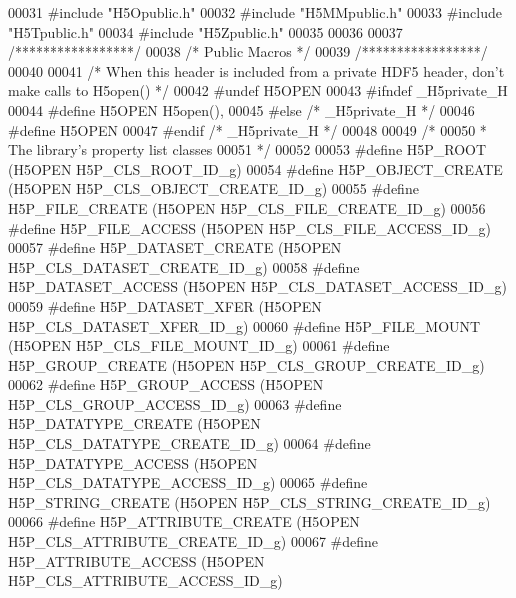 \begin{DoxyCode}
00031 \textcolor{preprocessor}{#include "H5Opublic.h"}
00032 \textcolor{preprocessor}{#include "H5MMpublic.h"}
00033 \textcolor{preprocessor}{#include "H5Tpublic.h"}
00034 \textcolor{preprocessor}{#include "H5Zpublic.h"}
00035 
00036 
00037 \textcolor{comment}{/*****************/}
00038 \textcolor{comment}{/* Public Macros */}
00039 \textcolor{comment}{/*****************/}
00040 
00041 \textcolor{comment}{/* When this header is included from a private HDF5 header, don't make calls to H5open() */}
00042 \textcolor{preprocessor}{#undef H5OPEN}
00043 \textcolor{preprocessor}{#ifndef \_H5private\_H}
00044 \textcolor{preprocessor}{#define H5OPEN        H5open(),}
00045 \textcolor{preprocessor}{#else   }\textcolor{comment}{/* \_H5private\_H */}\textcolor{preprocessor}{}
00046 \textcolor{preprocessor}{#define H5OPEN}
00047 \textcolor{preprocessor}{#endif  }\textcolor{comment}{/* \_H5private\_H */}\textcolor{preprocessor}{}
00048 
00049 \textcolor{comment}{/*}
00050 \textcolor{comment}{ * The library's property list classes}
00051 \textcolor{comment}{ */}
00052 
00053 \textcolor{preprocessor}{#define H5P\_ROOT            (H5OPEN H5P\_CLS\_ROOT\_ID\_g)}
00054 \textcolor{preprocessor}{#define H5P\_OBJECT\_CREATE       (H5OPEN H5P\_CLS\_OBJECT\_CREATE\_ID\_g)}
00055 \textcolor{preprocessor}{#define H5P\_FILE\_CREATE         (H5OPEN H5P\_CLS\_FILE\_CREATE\_ID\_g)}
00056 \textcolor{preprocessor}{#define H5P\_FILE\_ACCESS         (H5OPEN H5P\_CLS\_FILE\_ACCESS\_ID\_g)}
00057 \textcolor{preprocessor}{#define H5P\_DATASET\_CREATE          (H5OPEN H5P\_CLS\_DATASET\_CREATE\_ID\_g)}
00058 \textcolor{preprocessor}{#define H5P\_DATASET\_ACCESS          (H5OPEN H5P\_CLS\_DATASET\_ACCESS\_ID\_g)}
00059 \textcolor{preprocessor}{#define H5P\_DATASET\_XFER            (H5OPEN H5P\_CLS\_DATASET\_XFER\_ID\_g)}
00060 \textcolor{preprocessor}{#define H5P\_FILE\_MOUNT              (H5OPEN H5P\_CLS\_FILE\_MOUNT\_ID\_g)}
00061 \textcolor{preprocessor}{#define H5P\_GROUP\_CREATE        (H5OPEN H5P\_CLS\_GROUP\_CREATE\_ID\_g)}
00062 \textcolor{preprocessor}{#define H5P\_GROUP\_ACCESS        (H5OPEN H5P\_CLS\_GROUP\_ACCESS\_ID\_g)}
00063 \textcolor{preprocessor}{#define H5P\_DATATYPE\_CREATE         (H5OPEN H5P\_CLS\_DATATYPE\_CREATE\_ID\_g)}
00064 \textcolor{preprocessor}{#define H5P\_DATATYPE\_ACCESS         (H5OPEN H5P\_CLS\_DATATYPE\_ACCESS\_ID\_g)}
00065 \textcolor{preprocessor}{#define H5P\_STRING\_CREATE       (H5OPEN H5P\_CLS\_STRING\_CREATE\_ID\_g)}
00066 \textcolor{preprocessor}{#define H5P\_ATTRIBUTE\_CREATE        (H5OPEN H5P\_CLS\_ATTRIBUTE\_CREATE\_ID\_g)}
00067 \textcolor{preprocessor}{#define H5P\_ATTRIBUTE\_ACCESS        (H5OPEN H5P\_CLS\_ATTRIBUTE\_ACCESS\_ID\_g)}

\end{DoxyCode}
